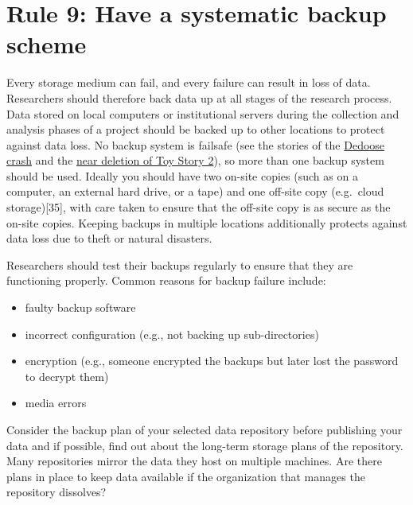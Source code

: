 \documentclass[10pt,letterpaper]{article}
\providecommand{\tightlist}{%
  \setlength{\itemsep}{0pt}\setlength{\parskip}{0pt}
}
\begin{document}
\section*{Rule 9: Have a systematic backup
scheme}\label{rule-9-have-a-systematic-backup-scheme}

Every storage medium can fail, and every failure can result in loss of
data. Researchers should therefore back data up at all stages of the
research process. Data stored on local computers or institutional
servers during the collection and analysis phases of a project should be
backed up to other locations to protect against data loss. No backup
system is failsafe (see the stories of the
\href{https://www.insidehighered.com/news/2014/05/16/dedoose-crash-shows-dangers-handing-data-cloud-services}{Dedoose
crash} and the
\href{http://thenextweb.com/media/2012/05/21/how-pixars-toy-story-2-was-deleted-twice-once-by-technology-and-again-for-its-own-good/}{near
deletion of Toy Story 2}), so more than one backup system should be
used. Ideally you should have two on-site copies (such as on a computer,
an external hard drive, or a tape) and one off-site copy (e.g.~cloud
storage){[}35{]}, with care taken to ensure that the off-site copy is as
secure as the on-site copies. Keeping backups in multiple locations
additionally protects against data loss due to theft or natural
disasters.

Researchers should test their backups regularly to ensure that they are
functioning properly. Common reasons for backup failure include:

\begin{itemize}
\tightlist
\item
  faulty backup software
\item
  incorrect configuration (e.g., not backing up sub-directories)
\item
  encryption (e.g., someone encrypted the backups but later lost the
  password to decrypt them)
\item
  media errors
\end{itemize}

Consider the backup plan of your selected data repository before
publishing your data and if possible, find out about the long-term
storage plans of the repository. Many repositories mirror the data they
host on multiple machines. Are there plans in place to keep data
available if the organization that manages the repository dissolves?
\end{document}
